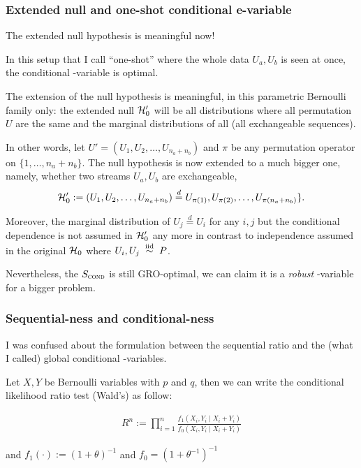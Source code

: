 \subsubsection{Extended null and one-shot conditional e-variable}

The extended null hypothesis is meaningful now!

In this setup that I call ``one-shot'' where the whole data $U_a, U_b$ is seen at once,
the conditional \E-variable is optimal.

The extension of the null hypothesis is meaningful, in this parametric Bernoulli family only:
the extended null $\mathcal{H}_0'$ will be all distributions where all permutation $U$ are the same
and the marginal distributions of all (all exchangeable sequences).

In other words, let $U'=(U_1,U_2,\dots,U_{n_a+n_b})$ and
$\pi$ be any permutation operator on $\{1,\dots,n_a+n_b\}$.
The null hypothesis is now extended to a much bigger one,
namely, whether two streams $U_a, U_b$ are exchangeable,
\begin{align*}
	\hypN':=(U_1,U_2,\dots,U_{n_a+n_b}) \overset{d}{=}
	U_{\pi(1)},U_{\pi(2)},\dots,U_{\pi(n_a+n_b)}\}.
\end{align*}

Moreover, the marginal distribution of $U_j \overset{d}{=} U_i$ for any $i, j$
but the conditional dependence is not assumed in $\mathcal{H}_0'$ any more
in contrast to independence assumed in the original $\mathcal{H}_0$
where $U_i, U_j \; \overset{\mathrm{iid}}{\sim} \; P$.

Nevertheless, the $S_{\textsc{cond}}$ is still GRO-optimal, we can claim it is a
\textit{robust} \E-variable for a bigger problem.

\subsubsection{Sequential-ness and conditional-ness}

I was confused about the formulation between the sequential ratio and
the (what I called) global conditional \E-variables.

Let $X,Y$ be Bernoulli variables with $p$ and $q$, then we can write the
conditional likelihood ratio test (Wald's) as follow:

\begin{align*}
	R^n := \prod_{i=1}^n \frac{f_1(X_i, Y_i \mid X_i + Y_i)}{f_0(X_i, Y_i \mid X_i + Y_i)}
\end{align*}

and $f_1(\cdot) := (1 + \theta)^{-1}$ and $f_0 = (1 + \theta^{-1})^{-1}$

